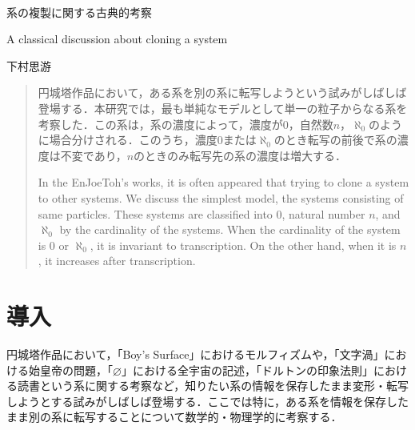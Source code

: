 \documentclass[10pt, a5paper, twoside]{jsarticle}
\theoremstyle{definition}
\begin{document}
	{\Large 　} %

	\begin{center}

		\Large{系の複製に関する古典的考察}

		\vspace{3mm}

		\large{A classical discussion about cloning a system}

		\vspace{3mm}
		
		\large{下村思游}

	\end{center}

	\vspace{3mm}

	\begin{abstract}

		円城塔作品において，ある系を別の系に転写しようという試みがしばしば登場する．本研究では，最も単純なモデルとして単一の粒子からなる系を考察した．この系は，系の濃度によって，濃度が0，自然数$n$，$\aleph_0$のように場合分けされる．このうち，濃度0または$\aleph_0$のとき転写の前後で系の濃度は不変であり，$n$のときのみ転写先の系の濃度は増大する．


		\vspace{3mm}

		In the EnJoeToh's works, it is often appeared that trying to clone a system to other systems. We discuss the simplest model, the systems consisting of same particles. These systems are classified into 0, natural number $n$, and $\aleph_0$ by the cardinality of the systems. When the cardinality of the system is 0 or $\aleph_0$, it is invariant to transcription. On the other hand, when it is $n$, it increases after transcription.

	\end{abstract}

	\section{導入}

		円城塔作品において，「Boy's Surface」におけるモルフィズムや，「文字渦」における始皇帝の問題，「$\varnothing$」における全宇宙の記述，「ドルトンの印象法則」における読書という系に関する考察など，知りたい系の情報を保存したまま変形・転写しようとする試みがしばしば登場する．ここでは特に，ある系を情報を保存したまま別の系に転写することについて数学的・物理学的に考察する．
\end{document}
